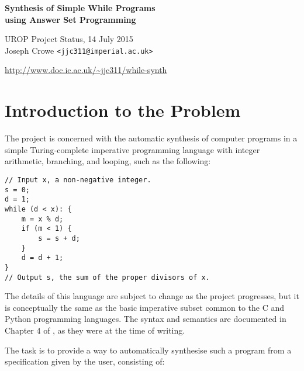 \documentclass[a4paper,twoside,notitlepage,12pt]{article}
\begin{document}
\begin{titlepage}
\begin{center}
    {\Large \bfseries Synthesis of Simple While Programs \\ using Answer Set Programming}

    {\large UROP Project Status, 14 July 2015} \\[0.5cm]
    
    {\large Joseph Crowe} \texttt{<jjc311@imperial.ac.uk>}
    
    \url{http://www.doc.ic.ac.uk/~jjc311/while-synth}\\[2cm]

    \tableofcontents
\end{center}
\end{titlepage}

\clearpage
\section{Introduction to the Problem} \label{sec:intro}

The project is concerned with the automatic synthesis of computer programs in a simple 
Turing-complete imperative programming language with integer arithmetic, branching, and
looping, such as the following:

\begin{verbatim}
// Input x, a non-negative integer.
s = 0;
d = 1;
while (d < x): {
    m = x % d;
    if (m < 1) {
        s = s + d;
    }
    d = d + 1;
}
// Output s, the sum of the proper divisors of x.
\end{verbatim}

The details of this language are subject to change as the project progresses, but it is 
conceptually the same as the basic imperative subset common to the C and Python 
programming languages. The syntax and semantics are documented in Chapter 4 of 
\cite{final}, as they were at the time of writing.

The task is to provide a way to automatically synthesise such a program from a 
specification given by the user, consisting of:
\end{document}
